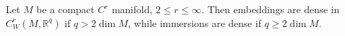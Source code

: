 Let $M$ be a compact $C^r$ manifold, $2 \leqslant r \leqslant \infty$. Then embeddings are dense in $C^r_W(M, \mathbb{R}^q)$ if $q > 2 \dim M$, while immersions are dense if $q \geqslant 2 \dim M$.
